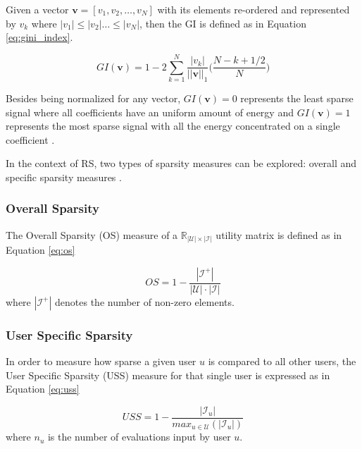     Given a vector $\textbf{v} = [v_1, v_2, \ldots, v_N]$ with its elements re-ordered and represented by $v_k$ where $|v_1| \leq |v_2| \ldots \leq |v_N|$, then the GI is defined as in Equation \ref{eq:gini_index}.
     
    \begin{equation}
        \label{eq:gini_index}
        GI(\textbf{v}) = 1 - 2\sum_{k=1}^{N} \frac{|v_k|}{||\textbf{v}||_1} \bigg( \frac{N-k+1/2}{N} \bigg)
    \end{equation}
     
    Besides being normalized for any vector, $GI(\textbf{v}) = 0$ represents the least sparse signal where all coefficients have an uniform amount of energy and $GI(\textbf{v}) = 1$ represents the most sparse signal with all the energy concentrated on a single coefficient \cite{10.1109/TIT.2009.2027527}. 
     
    In the context of RS, two types of sparsity measures can be explored: overall and specific sparsity measures \cite{10.1016/j.eswa.2010.09.141}.
    
    \subsubsection{Overall Sparsity} 

		The Overall Sparsity (OS)  measure of a $\mathbb{R}_{|\mathcal{U}| \times |\mathcal{I}|}$ utility matrix is defined as in Equation \ref{eq:os}
	
		\begin{equation}
			\label{eq:os}
			OS = 1 - \frac{|\mathcal{I}^+|}{|\mathcal{U}| \cdot |\mathcal{I}|}	 
		\end{equation} where $|\mathcal{I}^+|$ denotes the number of non-zero elements. 

	\subsubsection{User Specific Sparsity}
	
	In order to measure how sparse a given user $u$ is compared to all other users, the User Specific Sparsity (USS)  measure for that single user is expressed as in Equation  \ref{eq:uss}

	\begin{equation}
		\label{eq:uss}
		USS = 1 - \frac{|\mathcal{I}_u|}{max_{u \in \mathcal{U}} (|\mathcal{I}_u|)}
	\end{equation} where $n_u$ is the number of evaluations input by user $u$. 
	
